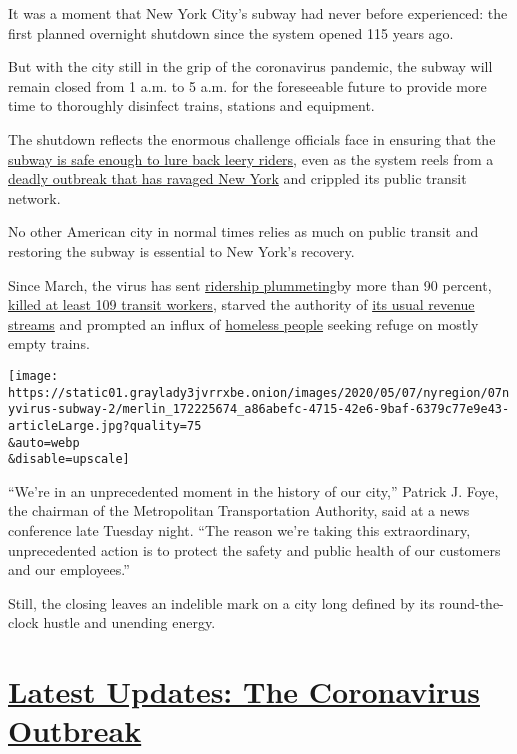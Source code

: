 It was a moment that New York City's subway had never before
experienced: the first planned overnight shutdown since the system
opened 115 years ago.

But with the city still in the grip of the coronavirus pandemic, the
subway will remain closed from 1 a.m. to 5 a.m. for the foreseeable
future to provide more time to thoroughly disinfect trains, stations and
equipment.

The shutdown reflects the enormous challenge officials face in ensuring
that the
\href{https://www.nytimes3xbfgragh.onion/2020/06/08/nyregion/mta-subway-riding-health-coronavirus.html}{subway
is safe enough to lure back leery riders}, even as the system reels from
a
\href{https://www.nytimes3xbfgragh.onion/2020/05/07/us/new-york-city-coronavirus-outbreak.html}{deadly
outbreak that has ravaged New York} and crippled its public transit
network.

No other American city in normal times relies as much on public transit
and restoring the subway is essential to New York's recovery.

Since March, the virus has sent
\href{https://www.nytimes3xbfgragh.onion/2020/03/24/nyregion/coronavirus-nyc-mta-cuts-.html}{ridership
plummeting}by more than 90 percent,
\href{https://www.nytimes3xbfgragh.onion/2020/05/05/nyregion/bus-drivers-new-york-coronavirus.html}{killed
at least 109 transit workers}, starved the authority of
\href{https://www.nytimes3xbfgragh.onion/2020/04/20/nyregion/nyc-mta-subway-coronavirus.html}{its
usual revenue streams} and prompted an influx of
\href{https://www.nytimes3xbfgragh.onion/2020/05/02/nyregion/coronavirus-nyc-subway-homeless.html}{homeless
people} seeking refuge on mostly empty trains.

\texttt{[image: https://static01.graylady3jvrrxbe.onion/images/2020/05/07/nyregion/07nyvirus-subway-2/merlin\_172225674\_a86abefc-4715-42e6-9baf-6379c77e9e43-articleLarge.jpg?quality=75\\\&auto=webp\\\&disable=upscale]}

``We're in an unprecedented moment in the history of our city,'' Patrick
J. Foye, the chairman of the Metropolitan Transportation Authority, said
at a news conference late Tuesday night. ``The reason we're taking this
extraordinary, unprecedented action is to protect the safety and public
health of our customers and our employees.''

Still, the closing leaves an indelible mark on a city long defined by
its round-the-clock hustle and unending energy.

\hypertarget{latest-updates-the-coronavirus-outbreak}{%
\section{\texorpdfstring{\href{https://www.nytimes3xbfgragh.onion/2020/08/21/world/covid-19-coronavirus.html?action=click\&pgtype=Article\&state=default\&region=MAIN_CONTENT_1\&context=storylines_live_updates}{Latest
Updates: The Coronavirus
Outbreak}}{Latest Updates: The Coronavirus Outbreak}}\label{latest-updates-the-coronavirus-outbreak}}

